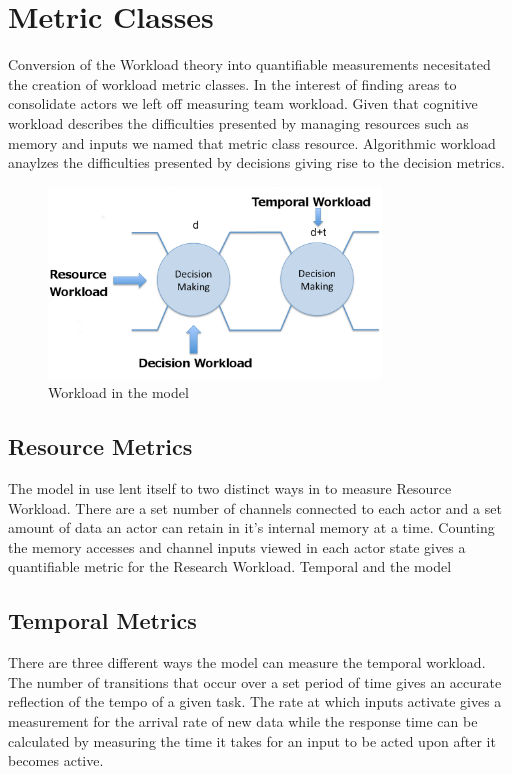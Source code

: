 \section{Metric Classes}
Conversion of the Workload theory into quantifiable measurements necesitated the creation of workload metric classes. In the interest of finding areas to consolidate actors we left off measuring team workload. Given that cognitive workload describes the difficulties presented by managing resources such as memory and inputs we named that metric class resource. Algorithmic workload anaylzes the difficulties presented by decisions giving rise to the decision metrics.


\begin{figure}
\center
\setlength{\abovecaptionskip}{1mm}
\setlength{\belowcaptionskip}{1mm}
\setlength{\textfloatsep}{1mm}
\setlength{\floatsep}{1mm}
\includegraphics[height=2in]{WorkloadMetrics.png}
\caption{Workload in the model}
\label{fig:WorkloadMetrics}
\end{figure}

\subsection{Resource Metrics}
The model in use lent itself to two distinct ways in to measure Resource Workload. There are a set number of channels connected to each actor and a set amount of data an actor can retain in it's internal memory at a time. Counting the memory accesses and channel inputs viewed in each actor state gives a quantifiable metric for the Research Workload.
Temporal and the model

\subsection{Temporal Metrics}
 There are three different ways the model can measure the temporal workload. The number of transitions that occur over a set period of time gives an accurate reflection of the tempo of a given task. The rate at which inputs activate gives a measurement for the arrival rate of new data while the response time can be calculated by measuring the time it takes for an input to be acted upon after it becomes active.

